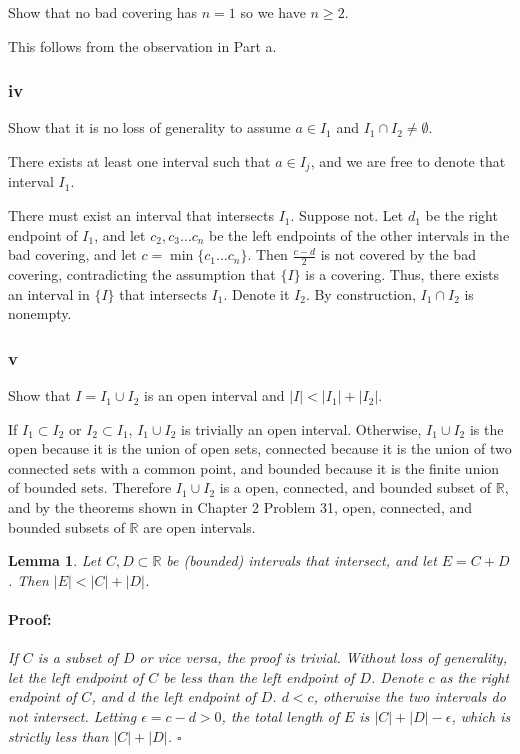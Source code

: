 \documentclass{article}
\newenvironment{proof}{\paragraph{Proof:}}{\hfill$\square$}
\newtheorem{lemma}[theorem]{Lemma}
\newcommand{\R}{\mathbb{R}}
\begin{document}
Show that no bad covering has $n=1$ so we have $n \geq 2$.

This follows from the observation in Part a.

\subsubsection*{iv}

Show that it is no loss of generality to assume $a \in I_1$ and $I_1 \cap I_2 \neq \emptyset$.

There exists at least one interval such that $a \in I_j$, and we are free to denote that interval $I_1$.

There must exist an interval that intersects $I_1$. Suppose not. Let $d_1$ be the right endpoint of $I_1$, and let $c_2, c_3 \dots c_n$ be the left endpoints of the other intervals in the bad covering, and let $c = \min\{c_1 \dots c_n\}$. Then $\frac{c-d}{2}$ is not covered by the bad covering, contradicting the assumption that $\{I\}$ is a covering. Thus, there exists an interval in $\{I\}$ that intersects $I_1$. Denote it $I_2$. By construction, $I_1 \cap I_2$ is nonempty.

\subsubsection*{v}

Show that $I = I_1 \cup I_2$ is an open interval and $|I| < |I_1| + |I_2|$.

If $I_1 \subset I_2$ or $I_2 \subset I_1$, $I_1 \cup I_2$ is trivially an open interval. Otherwise, $I_1 \cup I_2$ is the open because it is the union of open sets, connected because it is the union of two connected sets with a common point, and bounded because it is the finite union of bounded sets. Therefore $I_1 \cup I_2$ is a open, connected, and bounded subset of $\R$, and by the theorems shown in Chapter 2 Problem 31, open, connected, and bounded subsets of $\R$ are open intervals.

\begin{lemma}
Let $C, D \subset \R$ be (bounded) intervals that intersect, and let $E = C + D$. Then $|E| < |C| + |D|$.

\begin{proof}
If $C$ is a subset of $D$ or vice versa, the proof is trivial. Without loss of generality, let the left endpoint of $C$ be less than the left endpoint of $D$. Denote $c$ as the right endpoint of $C$, and $d$ the left endpoint of $D$. $d < c$, otherwise the two intervals do not intersect. Letting $\epsilon = c - d > 0$, the total length of $E$ is $|C| + |D| - \epsilon$, which is strictly less than $|C| + |D|$.
\end{proof}
\end{lemma}
\end{document}

